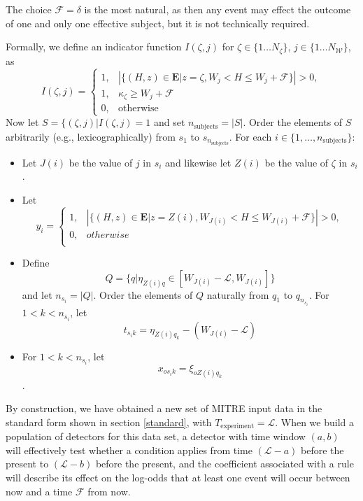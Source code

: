 \documentclass[12pt]{article}
\begin{document}
  The choice $\mathcal F=\delta$ is the most natural, as then any event
  may effect the outcome of one and only one effective subject, but it is not technically required.

Formally, we define an indicator function $I(\zeta,j)$ for $\zeta \in
\{1 \ldots N_\zeta\}$, $j \in \{1 \ldots N_\mathcal W\}$, as
\[  I(\zeta, j) = \left\{
\begin{array}{ll} 1, & | \{ (H, z) \in \mathbf E \vert z = \zeta, W_j < H \leq W_j + \mathcal F\} | > 0, \\
  1, & \kappa_\zeta \geq W_j + \mathcal F  \\
  0, & \text{otherwise}
\end{array}
\right.
\]
Now let $S = \{ (\zeta, j) \vert I (\zeta,j) = 1$ and set $n_\text{subjects}=|S|$. Order the elements of
$S$ arbitrarily (e.g., lexicographically) from $s_1$ to $s_{n_\text{subjects}}$.
For each $i \in \{1, \ldots, n_\text{subjects}\}$:
\begin{itemize}
\item Let $J(i)$ be the value
  of $j$ in $s_i$ and likewise let $Z(i)$ be the value of $\zeta$ in $s_i$.
\item Let 
\[  y_i = \left\{
\begin{array}{ll} 1, & | \{ (H, z) \in \mathbf E \vert z = Z(i), W_{J(i)} < H \leq W_{J(i)} + \mathcal F\} | > 0, \\
  0, & otherwise  \\
\end{array}
\right.
\]
\item Define
  \[ Q = \{ q | \eta_{Z(i)q} \in [W_{J(i)} - \mathcal L, W_{J(i)}]\} \]
  and let $n_{s_i}=|Q|$. Order the elements of $Q$ naturally from $q_1$ to
  $q_{n_{s_i}}$. For $1<k<n_{s_i}$, let
  \[t_{{s_i}k} = \eta_{Z(i)q_k} - (W_{J(i)} - \mathcal L)\]
\item For $1<k<n_{s_i}$, let \[x_{o{s_i}k} = \xi_{oZ(i){q_k}}\].
\end{itemize}

By construction, we have obtained a new set of MITRE input data in the
standard form shown in section \ref{standard}, with
$T_\text{experiment}=\mathcal L$. When we build a population of
detectors for this data set, a detector with time window $(a,b)$ will
effectively test whether a condition applies from time $(\mathcal
L-a)$ before the present to $(\mathcal L-b)$ before the present, and
the coefficient associated with a rule will describe its effect on the
log-odds that at least one event will occur between now and a time
$\mathcal F$ from now.
\end{document}
